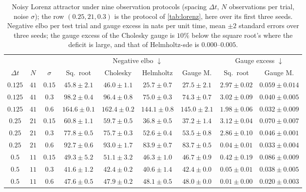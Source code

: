 \documentclass{article} %
\begin{document}
\begin{table}[t]
    \centering
    \caption{Noisy Lorenz attractor under nine observation protocols (spacing $\Delta t$, $N$ observations per trial, noise $\sigma$); the row $(0.25, 21, 0.3)$ is the protocol of \cref{tab:lorenz}, here over its first three seeds. Negative \gls{elbo} per test trial and gauge excess in nats per unit time, mean $\pm 2$ standard errors over three seeds; the gauge excess of the Cholesky gauge is $10\%$ below the square root's where the deficit is large, and that of Helmholtz-\gls{sde} is $0.000$--$0.005$.}
    \label{tab:lorenzrobustness}
    \small
    \setlength{\tabcolsep}{3pt}
    \begin{tabular}{ccccccccc}
        \toprule
        & & & \multicolumn{4}{c}{Negative \gls{elbo} $\downarrow$} & \multicolumn{2}{c}{Gauge excess $\downarrow$} \\
        \cmidrule(lr){4-7} \cmidrule(lr){8-9}
        $\Delta t$ & $N$ & $\sigma$ & Sq.\ root & Cholesky & Helmholtz & Gauge M. & Sq.\ root & Gauge M. \\
        \midrule
        $0.125$ & $41$ & $0.15$ & $45.8 \pm 2.1$ & $46.0 \pm 1.1$ & $25.7 \pm 0.7$ & $27.5 \pm 2.1$ & $2.97 \pm 0.02$ & $0.059 \pm 0.014$ \\
        $0.125$ & $41$ & $0.3$ & $98.2 \pm 0.4$ & $96.4 \pm 0.8$ & $75.0 \pm 0.3$ & $74.3 \pm 0.7$ & $3.02 \pm 0.09$ & $0.040 \pm 0.005$ \\
        $0.125$ & $41$ & $0.6$ & $164.6 \pm 0.1$ & $162.4 \pm 0.2$ & $144.1 \pm 0.8$ & $145.0 \pm 2.1$ & $1.98 \pm 0.06$ & $0.032 \pm 0.009$ \\
        $0.25$ & $21$ & $0.15$ & $60.8 \pm 1.1$ & $59.7 \pm 0.5$ & $36.8 \pm 0.5$ & $37.2 \pm 1.4$ & $3.12 \pm 0.04$ & $0.070 \pm 0.007$ \\
        $0.25$ & $21$ & $0.3$ & $77.8 \pm 0.5$ & $75.7 \pm 0.3$ & $52.6 \pm 0.4$ & $53.5 \pm 0.8$ & $2.86 \pm 0.10$ & $0.046 \pm 0.001$ \\
        $0.25$ & $21$ & $0.6$ & $92.7 \pm 0.6$ & $93.0 \pm 1.7$ & $83.9 \pm 0.7$ & $83.7 \pm 0.5$ & $0.04 \pm 0.01$ & $0.033 \pm 0.004$ \\
        $0.5$ & $11$ & $0.15$ & $49.3 \pm 5.2$ & $51.1 \pm 3.2$ & $46.3 \pm 1.0$ & $46.7 \pm 0.9$ & $0.42 \pm 0.19$ & $0.086 \pm 0.009$ \\
        $0.5$ & $11$ & $0.3$ & $41.6 \pm 1.2$ & $42.4 \pm 0.2$ & $40.6 \pm 1.4$ & $42.4 \pm 0.0$ & $0.05 \pm 0.01$ & $0.038 \pm 0.005$ \\
        $0.5$ & $11$ & $0.6$ & $47.6 \pm 0.5$ & $47.9 \pm 0.2$ & $48.1 \pm 0.5$ & $48.0 \pm 0.0$ & $0.01 \pm 0.00$ & $0.020 \pm 0.003$ \\
        \bottomrule
    \end{tabular}
\end{table}
\end{document}
